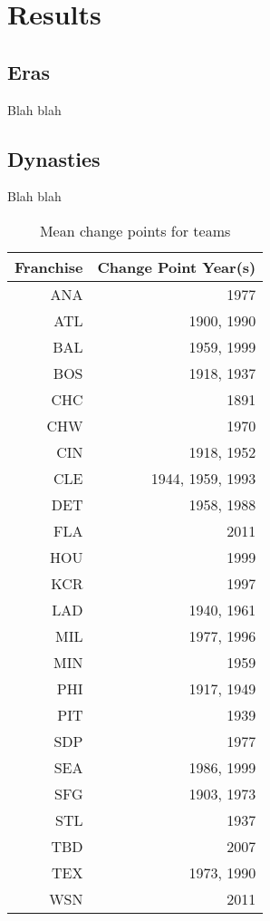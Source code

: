 \documentclass[USenglish]{article}
\theoremstyle{dgthm}
\theoremstyle{dgdef}
\begin{document}



\section{Results}
\subsection{Eras}
Blah blah 
\subsection{Dynasties}
Blah blah 

\begin{table}
\begin{tabular}{|r|r|}
Franchise & Change Point Year(s) \\
\hline
ANA       & 1977             \\
ATL       & 1900, 1990       \\
BAL       & 1959, 1999      \\
BOS       & 1918, 1937       \\
CHC       & 1891             \\
CHW       & 1970             \\
CIN       & 1918, 1952       \\
CLE       & 1944, 1959, 1993 \\
DET       & 1958, 1988       \\
FLA       & 2011             \\
HOU       & 1999             \\
KCR       & 1997             \\
LAD       & 1940, 1961       \\
MIL       & 1977, 1996       \\
MIN       & 1959             \\
PHI       & 1917, 1949       \\
PIT       & 1939             \\
SDP       & 1977             \\
SEA       & 1986, 1999       \\
SFG       & 1903, 1973       \\
STL       & 1937             \\
TBD       & 2007             \\
TEX       & 1973, 1990       \\
WSN       & 2011             \\
\end{tabular}
\caption{Mean change points for teams}
\label{tab:mean:team}
\end{table}
\end{document}
